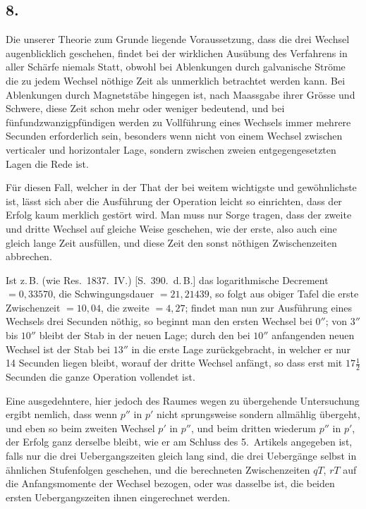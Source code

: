 \documentclass[12pt,a4paper]{article}
\begin{document}
\subsection*{8.}

Die unserer Theorie zum Grunde liegende Voraussetzung, dass die drei Wechsel augenblicklich geschehen, findet bei der wirklichen Ausübung des Verfahrens in aller Schärfe niemals Statt, obwohl bei Ablenkungen durch galvanische Ströme die zu jedem Wechsel nöthige Zeit als unmerklich betrachtet werden kann. Bei Ablenkungen durch Magnetstäbe hingegen ist, nach Maassgabe ihrer Grösse und Schwere, diese Zeit schon mehr oder weniger bedeutend, und bei fünfundzwanzigpfündigen werden zu Vollführung eines Wechsels immer mehrere Secunden erforderlich sein, besonders wenn nicht von einem Wechsel zwischen verticaler und horizontaler Lage, sondern zwischen zweien entgegengesetzten Lagen die Rede ist.

Für diesen Fall, welcher in der That der bei weitem wichtigste und gewöhnlichste ist, lässt sich aber die Ausführung der Operation leicht so einrichten, dass der Erfolg kaum merklich gestört wird. Man muss nur Sorge tragen, dass der zweite und dritte Wechsel auf gleiche Weise geschehen, wie der erste, also auch eine gleich lange Zeit ausfüllen, und diese Zeit den sonst nöthigen Zwischenzeiten abbrechen.

Ist z.\,B. (wie Res.~1837.~IV.) [S.~390.~d.\,B.] das logarithmische Decrement $= 0{,}33570$, die Schwingungsdauer $= 21{,}21439$, so folgt aus obiger Tafel die erste Zwischenzeit $= 10{,}04$, die zweite $= 4{,}27$; findet man nun zur Ausführung eines Wechsels drei Secunden nöthig, so beginnt man den ersten Wechsel bei $0''$; von $3''$ bis $10''$ bleibt der Stab in der neuen Lage; durch den bei $10''$ anfangenden neuen Wechsel ist der Stab bei $13''$ in die erste Lage zurückgebracht, in welcher er nur 14 Secunden liegen bleibt, worauf der dritte Wechsel anfängt, so dass erst mit $17\tfrac{1}{2}$ Secunden die ganze Operation vollendet ist.

Eine ausgedehntere, hier jedoch des Raumes wegen zu übergehende Untersuchung ergibt nemlich, dass wenn $p''$ in $p'$ nicht sprungsweise sondern allmählig übergeht, und eben so beim zweiten Wechsel $p'$ in $p''$, und beim dritten wiederum $p''$ in $p'$, der Erfolg ganz derselbe bleibt, wie er am Schluss des 5.~Artikels angegeben ist, falls nur die drei Uebergangszeiten gleich lang sind, die drei Uebergänge selbst in ähnlichen Stufenfolgen geschehen, und die berechneten Zwischenzeiten $qT$, $rT$ auf die Anfangsmomente der Wechsel bezogen, oder was dasselbe ist, die beiden ersten Uebergangszeiten ihnen eingerechnet werden.
\end{document}
